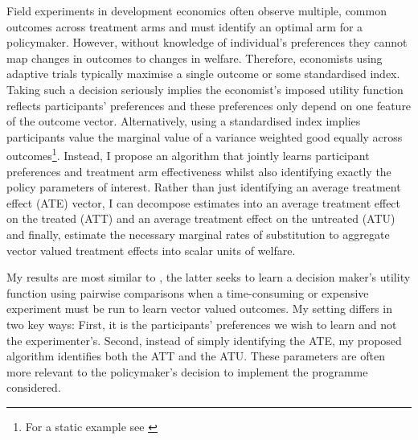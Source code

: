 \documentclass[twoside,11pt]{article}
\begin{document}
Field experiments in development economics often observe multiple, common outcomes 
across treatment arms and must identify an optimal arm for a policymaker. However, 
without knowledge of individual's preferences they cannot map changes in outcomes 
to changes in welfare.
 Therefore, economists using adaptive trials typically maximise a single outcome or 
 some standardised index. Taking such a decision seriously 
implies the economist's imposed utility function reflects participants' preferences 
and these preferences only depend on one feature of the outcome vector. Alternatively, 
using a standardised index implies 
participants value the marginal value of a variance weighted good equally across 
outcomes\footnote{For a static example see \cite{ashraf2010a,blattman2017a,bandiera2017a}}. Instead, I propose an algorithm that jointly learns participant 
preferences and treatment arm effectiveness whilst also identifying exactly the 
policy parameters of interest. Rather than just identifying  an average treatment effect (ATE) vector, 
I can decompose estimates into an average treatment effect on the treated (ATT) and 
an average treatment effect on the untreated (ATU) and finally, estimate the necessary marginal 
rates of substitution to 
aggregate vector valued treatment effects into scalar units of  welfare. 


My results are most similar to \citep{dewancker2016a,lin2022preference}, the latter seeks 
to learn a decision maker's utility function using pairwise comparisons when a 
time-consuming or expensive experiment must be run to learn 
vector valued outcomes. My setting differs in two key ways: First, it is the 
participants' preferences we wish to learn and not the experimenter's. Second, 
instead of simply identifying the ATE, my proposed algorithm identifies both 
the ATT and the ATU. These parameters are often more relevant to the policymaker's 
decision to implement the programme considered.
\end{document}
